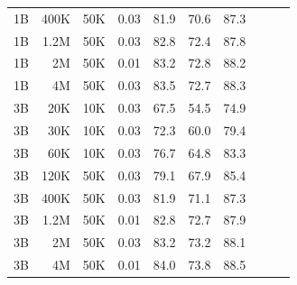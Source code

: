\begin{table}[h]
\begin{tabulary}{1.0\textwidth}{l r c c c c c c c c}
1B    & 400K  & 50K   & 0.03 & 81.9 & 70.6 & 87.3 \\
1B    & 1.2M  & 50K   & 0.03 & 82.8 & 72.4 & 87.8 \\
1B    & 2M    & 50K   & 0.01 & 83.2 & 72.8 & 88.2 \\
1B    & 4M    & 50K   & 0.03 & 83.5 & 72.7 & 88.3 \\
\midrule[0.25pt]
3B    & 20K   & 10K   & 0.03 & 67.5 & 54.5 & 74.9 \\
3B    & 30K   & 10K   & 0.03 & 72.3 & 60.0 & 79.4 \\
3B    & 60K   & 10K   & 0.03 & 76.7 & 64.8 & 83.3 \\
3B    & 120K  & 50K   & 0.03 & 79.1 & 67.9 & 85.4 \\
3B    & 400K  & 50K   & 0.03 & 81.9 & 71.1 & 87.3 \\
3B    & 1.2M  & 50K   & 0.01 & 82.8 & 72.7 & 87.9 \\
3B    & 2M    & 50K   & 0.03 & 83.2 & 73.2 & 88.1 \\
3B    & 4M    & 50K   & 0.01 & 84.0 & 73.8 & 88.5 \\
    \bottomrule
  \end{tabulary}
\end{table}

